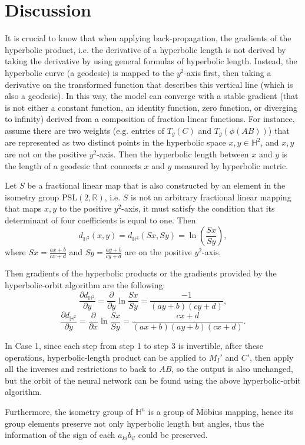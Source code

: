 \documentclass{article}
\theoremstyle{plain}
\theoremstyle{plain} %
\theoremstyle{definition}  %
\theoremstyle{remark}  %
\theoremstyle{plain}
\begin{document}
\section{Discussion}
It is crucial to know that when applying back-propagation, the gradients of the hyperbolic product, i.e. the derivative of a hyperbolic length is not derived by taking the derivative by using general formulas of hyperbolic length. Instead, the hyperbolic curve (a geodesic) is mapped to the $y^2$-axis first, then taking a derivative on the transformed function that describes this vertical line (which is also a geodesic). In this way, the model can converge with a stable gradient (that is not either a constant function, an identity function, zero function, or diverging to infinity) derived from a composition of fraction linear functions.
For instance, assume there are two weights (e.g. entries of $T_g(C)$ and $T_g(\phi (AB))$) that are represented as two distinct points in the hyperbolic space $x, y\in\mathbb{H}^2$, and $x, y$ are not on the positive $y^2$-axis.
Then the hyperbolic length between $x$ and $y$ is the length of a geodesic that connects $x$ and $y$ measured by hyperbolic metric.

Let $S$ be a fractional linear map that is also constructed by an element in the isometry group $\text{PSL}(2,\mathbb{R})$, i.e. $S$ is not an arbitrary fractional linear mapping that maps $x,y$ to the positive $y^2$-axis, it must satisfy the condition that its determinant of four coefficients is equal to one. Then
$$
d_{\mathbb{H}^2}(x,y)=d_{\mathbb{H}^2}(Sx,Sy)=\ln \left( \frac{ Sx}{Sy}\right),
$$
where $Sx=\frac{ax+b}{cx+d}$ and $Sy=\frac{ay+b}{cy+d}$ are on the positive $y^2$-axis.

Then gradients of the hyperbolic products or the gradients provided by the hyperbolic-orbit algorithm are the following:
$$
\frac{\partial d_{\mathbb{H}^2}}{\partial y}=\frac{\partial }{\partial y}\ln \frac{Sx}{Sy}=\frac{-1}{(ay+b)(cy+d)},
$$
$$
\frac{\partial d_{\mathbb{H}^2}}{\partial y}=\frac{\partial }{\partial x}\ln \frac{Sx}{Sy}=\frac{cx+d}{(ax+b)(ay+b)(cx+d)}.
$$

In Case 1, since each step from step 1 to step 3 is invertible, after these operations, hyperbolic-length product can be applied to $M_I'$ and $C'$, then apply all the inverses and restrictions to back to $AB$, so the output is also unchanged, but the orbit of the neural network can be found using the above hyperbolic-orbit algorithm.

Furthermore, the isometry group of $\mathbb{H}^n$ is a group of M\"{o}bius mapping, hence its group elements preserve not only hyperbolic length but angles, thus the information of the sign of each $a_{ki}b_{il}$ could be preserved.
\end{document}
